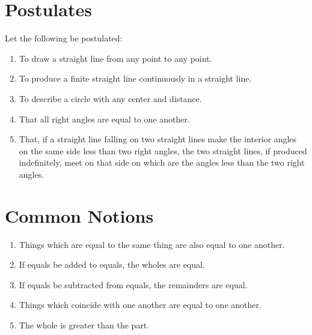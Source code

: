 \documentclass[12pt, twoside]{memoir}
\begin{document}
\chapter*{Postulates}
\renewcommand{\currentpropheader}{Postulates}
Let the following be postulated:
\begin{enumerate}
    \item To draw a straight line from any point to any point. \label{post:I.I}
    \item To produce a finite straight line continuously in a straight line. \label{post:I.II}
    \item To describe a circle with any center and distance. \label{post:I.III} 
    \item That all right angles are equal to one another. \label{post:I.IV}
    \item That, if a straight line falling on two straight lines make the interior angles on the same side less than two right angles, the two straight lines, if produced indefinitely, meet on that side on which are the angles less than the two right angles. \label{post:I.V}
    
        \iftoggle{defpics}{~\hfill\drawCurrentPicture\hfill~}{}
\end{enumerate}

\chapter*{Common Notions}
 \renewcommand{\currentpropheader}{Common Notions}
\begin{enumerate}
    \item Things which are equal to the same thing are also equal to one another. \label{cn:I.I}
    \item If equals be added to equals, the wholes are equal. \label{cn:I.II}
    \item If equals be subtracted from equals, the remainders are equal. \label{cn:I.III}
    \item Things which coincide with one another are equal to one another. \label{cn:I.IV}
    \item The whole is greater than the part. \label{cn:I.V}
\end{enumerate}
\end{document}
